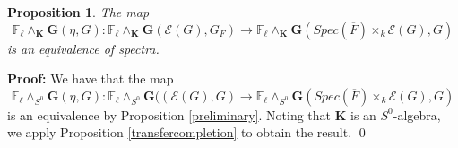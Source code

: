 \documentclass[11pt]{article}
\newcommand\mb{\mathbb}
\newcommand\mc{\mathcal}
\def \bK{\mathbf K}
\newcommand\mfk{\mathbf G}
\newtheorem{Proposition}{Proposition}[section]
\newenvironment{Proof}{\par\noindent\textbf{Proof:}}
{\qed}
\begin{document}
 \begin{Proposition} \label{finalrigidity}
     The map 
     \begin{equation}\label{nearfinal1} \mb{F}_{\ell} \wedge _{\bK}\mfk(\eta,G) : \mb{F}_{\ell} \wedge _{\bK}\mfk({\mc{E}(G)},G_F) \rightarrow \mb{F}_{\ell} \wedge _{\bK}\mfk(Spec   (\overline{F}) \times _k {\mc{E}(G) },G)
    \end{equation}
    is an equivalence of spectra.  
 \end{Proposition}
 \begin{Proof}
 We have that the map 
 \begin{equation} \mb{F}_{\ell} \wedge _{S^0}\mfk(\eta,G) : \mb{F}_{\ell} \wedge _{S^0}\mfk((\mc{E}(G),G)
 \rightarrow \mb{F}_{\ell} \wedge _{S^0}\mfk(Spec   (\overline{F}) \times _k {\mc{E}(G)},G)
    \end{equation}
    is an equivalence by Proposition \ref{preliminary}. 
     Noting that  $\bK$ is an $S^0$-algebra, we apply Proposition \ref{transfercompletion} to obtain the result.  
 \end{Proof}

  
   
\end{document}
